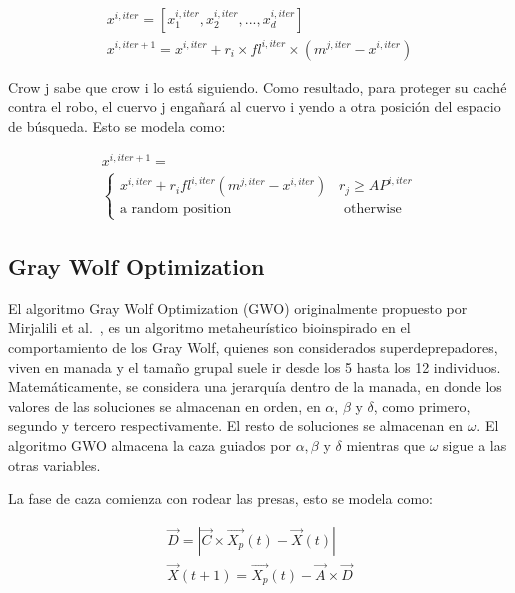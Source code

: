 \documentclass[conference]{IEEEtran}
\begin{document}
\begin{equation}
\begin{gathered}
x^{i,iter} = [x_{1}^{i,iter}, x_{2}^{i,iter},...,x_{d}^{i,iter}]\\
x^{i,iter+1}=x^{i,iter}+r_{i} \times fl^{i,iter} \times (m^{j,iter}-x^{i,iter})
\end{gathered}
\label{eq23}
\end{equation}

Crow j sabe que crow i lo está siguiendo. Como resultado, para proteger su caché contra el robo, el cuervo j engañará al cuervo i yendo a otra posición del espacio de búsqueda. Esto se modela como:

\begin{equation}
\begin{gathered}
x^{i,iter+1}=\\
\begin{cases}
x^{i,iter}+r_{i} fl^{i,iter} (m^{j,iter} - x^{i,iter}) \; \; \; r_j \geq AP^{i,iter}\\
\text{a random position} \; \; \; \; \; \;\; \; \;\; \; \;\;\; \; \;\;\; \; \; \; \;\;\; \; \;\; \; \;  \text{otherwise}
\end{cases}
\end{gathered}
\label{eq24}
\end{equation}


\subsection{Gray Wolf Optimization}

El algoritmo Gray Wolf Optimization (GWO) originalmente propuesto por Mirjalili et al.~\cite{Mirjalili2014}, es un algoritmo metaheurístico bioinspirado en el comportamiento de los Gray Wolf, quienes son considerados superdeprepadores, viven en manada y el tamaño grupal suele ir desde los 5 hasta los 12 individuos. Matemáticamente, se considera una jerarquía dentro de la manada, en donde los valores de las soluciones se almacenan en orden, en $\alpha$, $\beta$ y $\delta$, como primero, segundo y tercero respectivamente. El resto de soluciones se almacenan en $\omega$. El algoritmo GWO almacena la caza guiados por $\alpha,\beta$ y $\delta$ mientras que $\omega$ sigue a las otras variables.

La fase de caza comienza con rodear las presas, esto se modela como:

\begin{equation}
\begin{gathered}
\vec{D} = |\vec{C} \times \vec{X_p}(t)-\vec{X}(t)|\\
\vec{X}(t+1) = \vec{X_p}(t) - \vec{A} \times \vec{D}
\end{gathered}
\label{eq25}
\end{equation}
\end{document}
